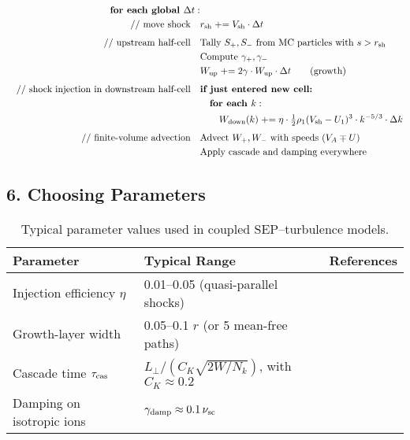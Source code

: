 \begin{tcolorbox}[colback=gray!5, colframe=black!40, title=Model Update Loop]
\begin{align*}
\textbf{for each global } \Delta t: & \\
\quad \text{// move shock} \quad & r_{\rm sh} \mathrel{+}= V_{\rm sh} \cdot \Delta t \\[1ex]
%
\quad \text{// upstream half-cell} \quad & \text{Tally } S_+, S_- \text{ from MC particles with } s > r_{\rm sh} \\
& \text{Compute } \gamma_+, \gamma_- \\
& W_{\rm up} \mathrel{+}= 2 \gamma \cdot W_{\rm up} \cdot \Delta t \qquad \text{(growth)} \\[1ex]
%
\quad \text{// shock injection in downstream half-cell} \quad & \textbf{if just entered new cell:} \\
& \quad \textbf{for each } k: \\
& \qquad W_{\rm down}(k) \mathrel{+}= \eta \cdot \tfrac{1}{2} \rho_1 (V_{\rm sh} - U_1)^3 \cdot k^{-5/3} \cdot \Delta k \\[1ex]
%
\quad \text{// finite-volume advection} \quad & \text{Advect } W_+, W_- \text{ with speeds } (V_A \mp U) \\
& \text{Apply cascade and damping everywhere}
\end{align*}
\end{tcolorbox}


\subsection*{6. Choosing Parameters}

\begin{table}[H]
\centering
\renewcommand{\arraystretch}{1.4}
\begin{tabularx}{\textwidth}{|l|X|X|}
\hline
\textbf{Parameter} & \textbf{Typical Range} & \textbf{References} \\
\hline
Injection efficiency $\eta$ & 0.01–0.05 (quasi-parallel shocks) & \cite{Caprioli2015, Kecskemety2020} \\
\hline
Growth-layer width & 0.05–0.1 $r$ (or 5 mean-free paths) & \cite{Desai2016} \\
\hline
Cascade time $\tau_{\rm cas}$ & $L_\perp / (C_K \sqrt{2W/N_k})$, with $C_K \approx 0.2$ & \cite{Oughton2011} \\
\hline
Damping on isotropic ions & $\gamma_{\rm damp} \approx 0.1\,\nu_{\rm sc}$ & \cite{Voelk1975, Ruffolo1995} \\
\hline
\end{tabularx}
\caption{Typical parameter values used in coupled SEP–turbulence models.}
\end{table}

